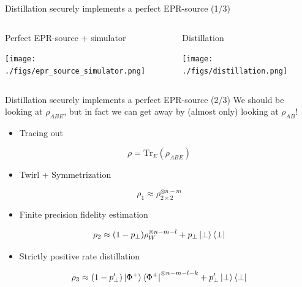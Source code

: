 \documentclass[presentation]{beamer}
\begin{document}
\begin{frame}[label={sec:org6609ddd}]{Distillation securely implements a perfect EPR-source (1/3)}
\begin{columns}[t]
\begin{column}{.5\columnwidth}
\begin{block}{Perfect EPR-source + simulator}
\begin{center}
\texttt{[image: ./figs/epr\_source\_simulator.png]}
\end{center}
\end{block}
\end{column}
\begin{column}{.5\columnwidth}
\begin{block}{Distillation}
\begin{center}
\texttt{[image: ./figs/distillation.png]}
\end{center}
\end{block}
\end{column}
\end{columns}
\end{frame}
\begin{frame}[label={sec:org5d19fde}]{Distillation securely implements a perfect EPR-source (2/3)}
We should be looking at \(\rho_{ABE}\), but in fact we can get away by (almost only) looking at \(\rho_{AB}\)!

\begin{itemize}
\item Tracing out
\end{itemize}
$$\rho = \text{Tr}_E(\rho_{ABE})$$
\begin{itemize}
\item Twirl + Symmetrization
\end{itemize}
$$\rho_1 \approx \rho_{2\times 2}^{\otimes n-m}$$
\begin{itemize}
\item Finite precision fidelity estimation
\end{itemize}
$$\rho_2  \approx (1-p_\perp) \rho_W^{\otimes n-m-l}  + p_\perp \ket{\perp}\bra{\perp}$$ 
\begin{itemize}
\item Strictly positive rate distillation
\end{itemize}
$$\rho_3 \approx (1-p_\perp') \ket{\Phi^+}\bra{\Phi^+} ^{\otimes n-m-l-k} + p_\perp' \ket{\perp}\bra{\perp}$$
\end{frame}
\end{document}
